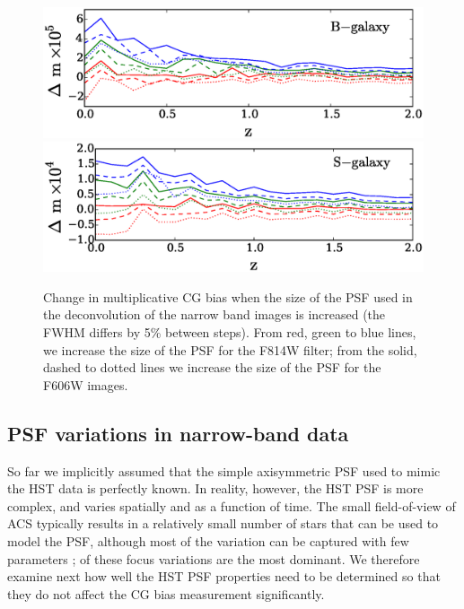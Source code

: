 \documentclass[useAMS,usenatbib]{mnras}
\begin{document}
\begin{figure}
\includegraphics[width=\hsize]{varpsfB.eps}
\includegraphics[width=\hsize]{varpsfS.eps}
\caption{Change in multiplicative CG bias when the size of the PSF used in the deconvolution
of the narrow band images is increased (the FWHM differs by 5\% between steps). From red,
green to blue lines, we increase the size of the PSF for the F814W filter; from the solid, dashed to dotted
lines we  increase the size of the PSF for the F606W images.}
\label{fig:psfacc1}
\end{figure}

\subsection{PSF variations in narrow-band data}
\label{sec:psfmodel}

So far we implicitly assumed that the simple axisymmetric PSF used to mimic the HST data
is perfectly known. In reality, however, the HST PSF is more complex, and varies spatially
and as a function of time. The small field-of-view of ACS typically results in a relatively small number
of stars that can be used to model the PSF, although most of the variation can be captured with
few parameters \citep[e.g.][]{Schrabback10}; of these focus variations are the most dominant. We therefore examine next how well the HST PSF  properties need to be determined so that they do not affect the CG bias measurement significantly.
\end{document}
